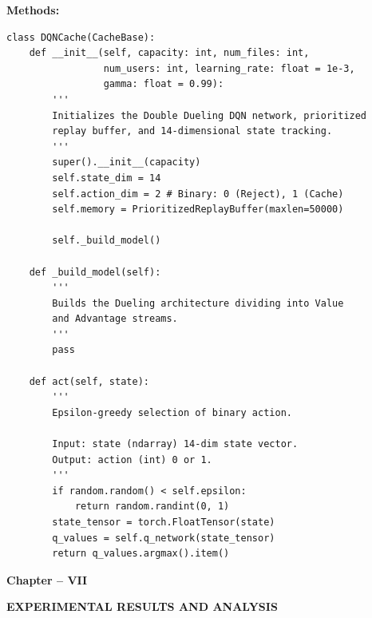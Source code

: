 \documentclass[12pt,a4paper]{article}
\begin{document}
\textbf{Methods:}
\begin{verbatim}
class DQNCache(CacheBase):
    def __init__(self, capacity: int, num_files: int, 
                 num_users: int, learning_rate: float = 1e-3, 
                 gamma: float = 0.99):
        '''
        Initializes the Double Dueling DQN network, prioritized 
        replay buffer, and 14-dimensional state tracking.
        '''
        super().__init__(capacity)
        self.state_dim = 14
        self.action_dim = 2 # Binary: 0 (Reject), 1 (Cache)
        self.memory = PrioritizedReplayBuffer(maxlen=50000)

        self._build_model()
        
    def _build_model(self):
        '''
        Builds the Dueling architecture dividing into Value 
        and Advantage streams.
        '''
        pass
        
    def act(self, state):
        '''
        Epsilon-greedy selection of binary action.
        
        Input: state (ndarray) 14-dim state vector.
        Output: action (int) 0 or 1.
        '''
        if random.random() < self.epsilon:
            return random.randint(0, 1)
        state_tensor = torch.FloatTensor(state)
        q_values = self.q_network(state_tensor)
        return q_values.argmax().item()
\end{verbatim}

\thispagestyle{plain}


\clearpage

\begin{center}
    \vspace*{10cm}
    
    {\fontsize{16}{19.2}\selectfont\bfseries
    Chapter -- VII}
    
    \vspace{1cm}
    
    {\fontsize{16}{19.2}\selectfont\bfseries
    EXPERIMENTAL RESULTS AND ANALYSIS}
    
    \vspace*{\fill}
\end{center}

\thispagestyle{plain}

\end{document}

